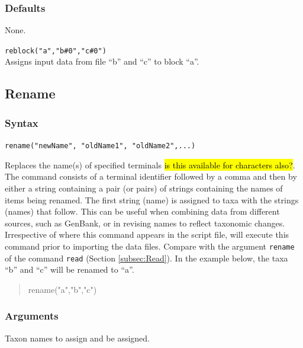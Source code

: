 	\subsubsection{Defaults}
		None.
	
	\begin{example}

		\item{\texttt{reblock("a","b\#0","c\#0")}\\ Assigns input data from file ``b'' and ``c'' 
		to block ``a''. }
	
	\end{example}

\subsection{Rename}
	\label{subsec:Rename}
	\subsubsection{Syntax}
		\texttt{rename("newName", "oldName1", "oldName2",...)}
		
	\begin{phygdescription}
	{Replaces the name(s) of specified terminals \hl{is this available for characters also?}. 
	The command consists of a terminal identifier followed by a comma and then by either 
	a string containing a pair (or pairs) of strings containing the names of items being renamed.
	The first string (name) is assigned to taxa with the strings (names) that follow. This can be 
	useful when combining data from different sources, such as GenBank, or in revising names 
	to reflect taxonomic changes. Irrespective of where this command appears in the script file, 
	\phyg will execute this command prior to importing the data files. Compare with the 
	argument \texttt{rename} of the command \texttt{read} (Section \ref{subsec:Read}).
	In the example below, the taxa ``b'' and ``c'' will be renamed to ``a''.

	\begin{quote}
	rename("a","b","c")
	\end{quote}}
	\end{phygdescription}
	
	\subsubsection{Arguments}
		Taxon names to assign and be assigned.
		
